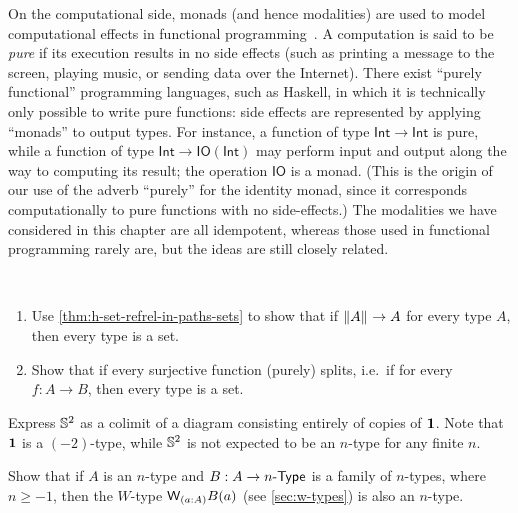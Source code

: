 On the computational side, monads (and hence modalities) are used to model computational effects in functional programming~\cite{Moggi89}.%
%
%
A computation is said to be \emph{pure} if its execution results in no side effects (such as printing a message to the screen, playing music, or sending data over the Internet).
There exist ``purely functional'' programming languages, such as Haskell, in which it is technically only possible to write pure functions: side effects are represented by applying ``monads'' to output types.
For instance, a function of type $\mathsf{Int}\to\mathsf{Int}$ is pure, while a function of type $\mathsf{Int}\to \mathsf{IO}(\mathsf{Int})$ may perform input and output along the way to computing its result; the operation $\mathsf{IO}$ is a monad.
%
(This is the origin of our use of the adverb ``purely'' for the identity monad, since it corresponds computationally to pure functions with no side-effects.)
The modalities we have considered in this chapter are all idempotent, whereas those used in functional programming rarely are, but the ideas are still closely related.


\sectionExercises

\begin{ex}\ 
  \begin{enumerate}
    \item Use \autoref{thm:h-set-refrel-in-paths-sets} to show 
    that if $\mathopen{}\left\Vert A\right\Vert_{}\mathclose{}\to A$ for every type $A$, 
    then every type is a set.
    \item Show that if every surjective function (purely) splits, 
    i.e.~if
    for every $f:A\to B$, then every type is a set.
  \end{enumerate}
\end{ex}

\begin{ex}\label{ex:s2-colim-unit}
  Express $\mathbb{S}^2$ as a colimit of a diagram consisting entirely of copies of $\mathbf{1}$.
  Note that $\mathbf{1}$ is a $(-2)$-type, while $\mathbb{S}^2$ is not expected to be an $n$-type for any finite $n$.
\end{ex}

\begin{ex}\label{ex:ntypes-closed-under-wtypes}
  Show that if $A$ is an $n$-type and $B:A\to {n}\text-\mathsf{Type}$ is a family of $n$-types, where $n\ge -1$, then the $W$-type $\wtype{a:A} B(a)$ (see \autoref{sec:w-types}) is also an $n$-type.
\end{ex}


